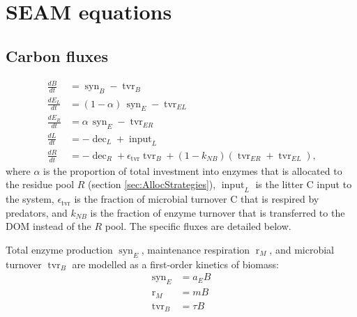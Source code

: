 \section{SEAM equations \label{app:SEAM}}    

\subsection{Carbon fluxes}
\begin{subequations}
\label{eq:SEAM}
\begin{align}
\frac{dB}{dt} &= \operatorname{syn}_B - \operatorname{tvr}_B \\
\frac{dE_L}{dt} &= (1 - \alpha)  \, \operatorname{syn}_E -\operatorname{tvr}_{EL}\\
\frac{dE_R}{dt} &= \alpha \, \operatorname{syn}_E - \operatorname{tvr}_{ER} \\
\frac{dL}{dt} &=  - \operatorname{dec}_L + \operatorname{input}_L
\\
\frac{dR}{dt} &=  - \operatorname{dec}_R +
\epsilon_{\operatorname{tvr}}  \operatorname{tvr}_B + (1 -k_{NB})
(\operatorname{tvr}_{ER} + \operatorname{tvr}_{EL})
\text{,} 
\end{align}
\end{subequations}
where $\alpha$ is the proportion of total investment into enzymes
that is allocated to the residue pool $R$ (section
\ref{sec:AllocStrategies}), $\operatorname{input}_L$
is the litter C input to the system, $\epsilon_{\operatorname{tvr}}$ is the
fraction of microbial turnover C that is respired by predators, and $k_{NB}$ is the fraction of enzyme turnover
that is transferred to the DOM instead of the $R$ pool.
The specific fluxes are detailed below.

Total enzyme production $\operatorname{syn}_E$, maintenance respiration
$\operatorname{r}_{M}$, and microbial turnover $\operatorname{tvr}_B$ are
modelled as a first-order kinetics of biomass:
\begin{subequations}
\begin{align}
\label{eq:synE} \operatorname{syn}_E &= a_E B \\
\label{eq:rM} \operatorname{r}_{M} &= m B \\
\label{eq:tvrB} \operatorname{tvr}_B &= \tau B 
\end{align}
\end{subequations}

